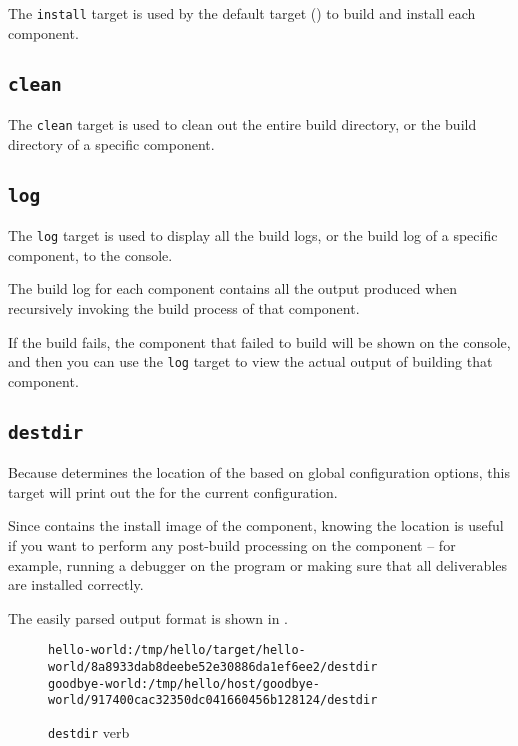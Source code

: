The \texttt{install} target is used by the default target
() to build and install each component.

\subsection{\texttt{clean}}

The \texttt{clean} target is used to clean out the entire build
directory, or the build directory of a specific component.

\subsection{\texttt{log}}

The \texttt{log} target is used to display all the build logs, or the
build log of a specific component, to the console.

The build log for each component contains all the output produced when
recursively invoking the build process of that component.

If the build fails, the component that failed to build will be shown
on the console, and then you can use the \texttt{log} target to view
the actual output of building that component.

\subsection{\texttt{destdir}}

Because \lmsbw determines the location of the \destdir based on global
configuration options, this target will print out the \destdir for the
current configuration.

Since \destdir contains the install image of the component, knowing
the \destdir location is useful if you want to perform any post-build
processing on the component -- for example, running a debugger on the
program or making sure that all deliverables are installed correctly.

The easily parsed output format is shown in
.

\begin{figure}[tbh]
\hrulefill
\begin{scriptsize}
\begin{verbatim}
hello-world:/tmp/hello/target/hello-world/8a8933dab8deebe52e30886da1ef6ee2/destdir
goodbye-world:/tmp/hello/host/goodbye-world/917400cac32350dc041660456b128124/destdir
\end{verbatim}
\end{scriptsize}
\hrulefill
\caption{\texttt{destdir} verb}\label{usinglmsbw:destdir-verb}
\end{figure}

